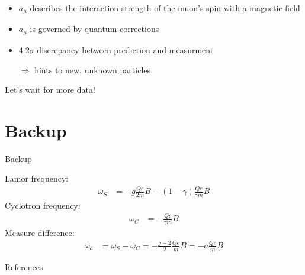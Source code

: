 \documentclass[12pt,notes]{beamer}
\begin{document}
\begin{frame}{\insertsection}
  \begin{itemize}
  \item $a_\mu$ describes the interaction strength of the muon's spin
    with a magnetic field
  \item $a_\mu$ is governed by quantum corrections
  \item $4.2\sigma$ discrepancy between prediction and measurment
  \item[$\Rightarrow$] hints to new, unknown particles
  \end{itemize}
  \begin{center}
    Let's wait for more data!
  \end{center}
\end{frame}


\section{Backup}

\begin{frame}{}
  \begin{center}
    \Large Backup
  \end{center}
\end{frame}


\begin{frame}{\insertsection}
  Lamor frequency:
  \begin{align*}
    \omega_S &= -g\frac{Qe}{2m}B - (1-\gamma)\frac{Qe}{\gamma m}B
  \end{align*}
  Cyclotron frequency:
  \begin{align*}
    \omega_C &= -\frac{Qe}{\gamma m}B
  \end{align*}
  Measure difference:
  \begin{align*}
    \omega_a &= \omega_S - \omega_C = -\frac{g-2}{2}\frac{Qe}{m}B = -a\frac{Qe}{m}B
  \end{align*}
\end{frame}



\begin{frame}[allowframebreaks]{References}
  \printbibliography
\end{frame}
\end{document}
